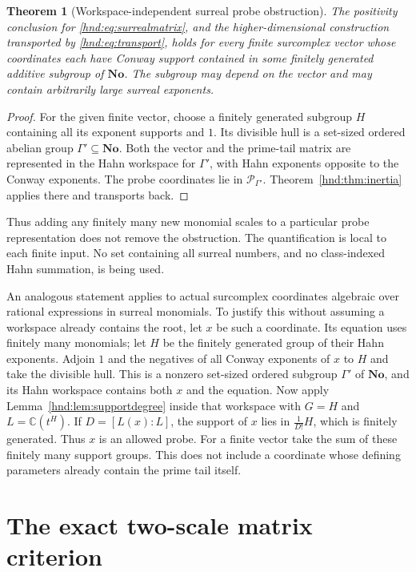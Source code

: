\documentclass[11pt,oneside]{article}
\newtheorem{theorem}{Theorem}[section]
\theoremstyle{definition}
\theoremstyle{remark}
\newcommand{\C}{\mathbb C}
\newcommand{\No}{\mathbf{No}}
\begin{document}
\begin{theorem}[Workspace-independent surreal probe obstruction]
\label{hnd:thm:surreal}
The positivity conclusion for \eqref{hnd:eq:surrealmatrix}, and the
higher-dimensional construction transported by \eqref{hnd:eq:transport},
holds for every finite surcomplex vector whose coordinates each have
Conway support contained in some finitely generated additive subgroup
of $\No$. The subgroup may depend on the vector and may contain
arbitrarily large surreal exponents.
\end{theorem}
\begin{proof}
For the given finite vector, choose a finitely generated subgroup $H$
containing all its exponent supports and $1$. Its divisible hull is a
set-sized ordered abelian group $\Gamma'\subseteq\No$.
Both the vector and the prime-tail matrix are represented in the Hahn
workspace for $\Gamma'$, with Hahn exponents opposite to the Conway
exponents. The probe coordinates lie in $\mathscr P_{\Gamma'}$.
Theorem~\ref{hnd:thm:inertia} applies there and transports back.
\end{proof}

Thus adding any finitely many new monomial scales to a particular probe
representation does not remove the obstruction. The quantification is
local to each finite input. No set containing all surreal numbers, and
no class-indexed Hahn summation, is being used.

An analogous statement applies to actual surcomplex coordinates
algebraic over rational expressions in surreal monomials. To justify
this without assuming a workspace already contains the root, let $x$
be such a coordinate. Its equation uses finitely many monomials;
let $H$ be the finitely generated group of their Hahn exponents.
Adjoin $1$ and the negatives of all Conway exponents of $x$ to $H$
and take the divisible hull. This is a nonzero set-sized ordered subgroup $\Gamma'$ of
$\No$, and its Hahn workspace contains both $x$ and the equation.
Now apply Lemma~\ref{hnd:lem:supportdegree} inside that workspace with
$G=H$ and $L=\C(t^H)$. If $D=[L(x):L]$, the support of $x$ lies in
$\frac1{D!}H$, which is finitely generated. Thus $x$ is an allowed probe.
For a finite vector take the sum of these finitely many support groups.
This does not include a coordinate whose defining parameters already
contain the prime tail itself.

\section{The exact two-scale matrix criterion}\label{hnd:sec:twoscale}
\end{document}
